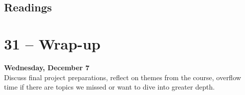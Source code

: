 \documentclass[10pt]{memoir}
\newenvironment{readinglist}{
\begin{list}{}{\leftmargin=8pt \itemindent=0em}
  \setlength{\itemsep}{8pt}
  \setlength{\parskip}{0em}
  \setlength{\parsep}{1em}
  \setlength{\parindent}{8em}}
{\end{list}}
\begin{document}
    \subsection{Readings}
    \begin{readinglist}
        \item {}
        \item {}
    \end{readinglist}

\section{31 -- Wrap-up}
\textcolor{CUGold}{\textbf{Wednesday, December 7}}\\
Discuss final project preparations, reflect on themes from the course, overflow time if there are topics we missed or want to dive into greater depth.



\newpage
\renewcommand{\bibsection}{\section{\huge \bibname}\prebibhook}
\baselineskip 14.2pt

\end{document}
